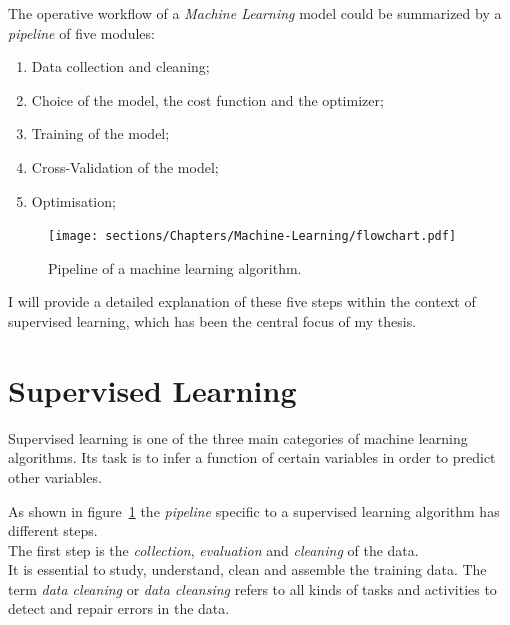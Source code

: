 The operative workflow of a \textit{Machine Learning} model could be summarized by a \textit{pipeline} of five modules:

\begin{enumerate}

\item Data collection and cleaning;
\item Choice of the model, the cost function and the optimizer;
\item Training of the model;
\item Cross-Validation of the model;
\item Optimisation;

\end{enumerate}

\begin{figure}[h]
\centering
\texttt{[image: sections/Chapters/Machine-Learning/flowchart.pdf]}
\caption{Pipeline of a machine learning algorithm.}
\label{fig:pipeline}
\end{figure}

I will provide a detailed explanation of these five steps within the context of supervised learning, which has been the central focus of my thesis.

\section{Supervised Learning}

Supervised learning is one of the three main categories of machine learning algorithms.
Its task is to infer a function of certain variables in order to predict other variables.

As shown in figure~\ref{fig:pipeline} the \textit{pipeline} specific to a supervised learning algorithm has different steps.\\

The first step is the \textit{collection}, \textit{evaluation} and \textit{cleaning} of the data.\\
It is essential to study, understand, clean and assemble the training data.
The term \textit{data cleaning} or \textit{data cleansing} refers to all kinds of tasks and activities to detect and repair errors in the data.\\

